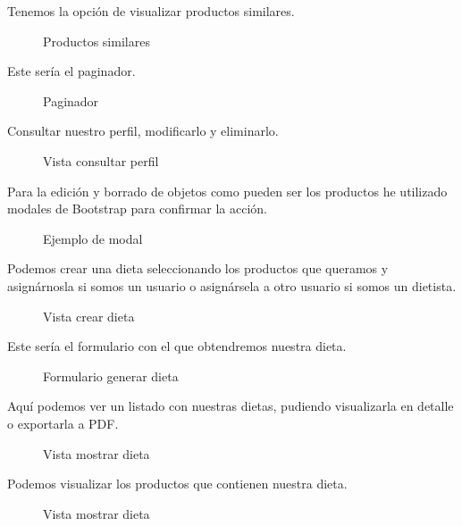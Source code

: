 Tenemos la opción de visualizar productos similares.

\begin{figure}[H]
    \centering
    \noindent{}
    \caption{Productos similares}
  \end{figure}

\newpage
Este sería el paginador.

\begin{figure}[H]
  \centering
  \noindent{}
  \caption{Paginador}
\end{figure}

Consultar nuestro perfil, modificarlo y eliminarlo.

\begin{figure}[H]
  \centering
  \noindent{}
  \caption{Vista consultar perfil}
\end{figure}

\newpage
Para la edición y borrado de objetos como pueden ser los productos he utilizado modales de Bootstrap para confirmar la acción.

\begin{figure}[H]
  \centering
  \noindent{}
  \caption{Ejemplo de modal}
\end{figure}

Podemos crear una dieta seleccionando los productos que queramos y asignárnosla si somos un usuario o asignársela a otro usuario si somos un dietista.

\begin{figure}[H]
  \centering
  \noindent{}
  \caption{Vista crear dieta}
\end{figure}

\newpage
Este sería el formulario con el que obtendremos nuestra dieta.

\begin{figure}[H]
    \centering
    \noindent{}
    \caption{Formulario generar dieta}
  \end{figure}
  
Aquí podemos ver un listado con nuestras dietas, pudiendo visualizarla en detalle o exportarla a PDF.
  
  \begin{figure}[H]
    \centering
    \noindent{}
    \caption{Vista mostrar dieta}
  \end{figure}

\newpage
Podemos visualizar los productos que contienen nuestra dieta.

\begin{figure}[H]
    \centering
    \noindent{}
    \caption{Vista mostrar dieta}
  \end{figure}


